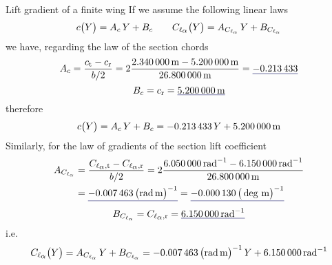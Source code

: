 \documentclass[[12pt,twoside]{book}
\begin{document}
\begin{myExampleX}{Lift gradient of a finite wing}{}
\medskip
If we assume the following linear laws
\[
c \big( Y \big) = A_c \, Y + B_c 
\qquad
C_{\ell_\mathlarger{\alpha}} \big( Y \big) = A_{C_{\ell_\alpha}} \, Y + B_{C_{\ell_\alpha}}
\]
we have, regarding the law of the section chords
\[
A_c
  = \frac{c_\mathrm{t} - c_\mathrm{r}}{b/2}
  = 
    2 \frac{
      \SI[round-precision=2]{\myChordTipWingMT}{\metre} - \SI[round-precision=2]{\myChordRootWingMT}{\metre}
    }{
      \SI[round-precision=2]{\mySpanWingMT}{\metre}
    }
  = \mathunderline{mydarkblue}{ \SI[round-precision=3]{\myCoeffAChordWing}{} }
\]
\[
B_c
  = c_\mathrm{r}
  = \mathunderline{mydarkblue}{ \SI[round-precision=2]{\myCoeffBChordWingMT}{\metre} }
\]
therefore
\[
c \big( Y \big) = A_c \, Y + B_c
  = \SI[round-precision=3]{\myCoeffAChordWing}{} \, Y
    + \SI[round-precision=2]{\myCoeffBChordWingMT}{\metre}
\]
Similarly, for the law of gradients of the section lift coefficient
\[
\begin{split}
A_{C_{\ell_\alpha}}
  & {}= \frac{C_{\ell_\mathlarger{\alpha},\mathrm{t}} - C_{\ell_\mathlarger{\alpha},\mathrm{r}}}{b/2}
  = 
    2 \frac{
      \SI[round-precision=2]{\myCLAlphaTipWingRAD}{\radian^{-1}} 
      - \SI[round-precision=2]{\myCLAlphaRootWingRAD}{\radian^{-1}}
    }{
      \SI[round-precision=2]{\mySpanWingMT}{\metre}
    }
\\
  & {}= 
    \mathunderline{mydarkblue}{ 
      \SI[round-precision=5]{\myCoeffAClalphaWingRADMT}{\big(\radian\,\metre\big)^{-1}} 
    }
  = 
    \mathunderline{mydarkblue}{ 
      \SI[round-precision=7]{\myCoeffAClalphaWingDEGMT}{\big(\deg\,\metre\big)^{-1}} 
    }
\end{split}
\]
\[
B_{C_{\ell_\alpha}}
  = C_{\ell_\mathlarger{\alpha},\mathrm{r}}
  = \mathunderline{mydarkblue}{ \SI[round-precision=3]{\myCoeffBClalphaWingRAD}{\radian^{-1}} }
\]
i.e.
\[
C_{\ell_\mathlarger{\alpha}} \big( Y \big) = A_{C_{\ell_\alpha}} \, Y + B_{C_{\ell_\alpha}}
  = \SI[round-precision=5]{\myCoeffAClalphaWingRADMT}{\big(\radian\,\metre\big)^{-1}} \, Y
    + \SI[round-precision=3]{\myCoeffBClalphaWingRAD}{\radian^{-1}}
\]


\end{myExampleX}
\end{document}
